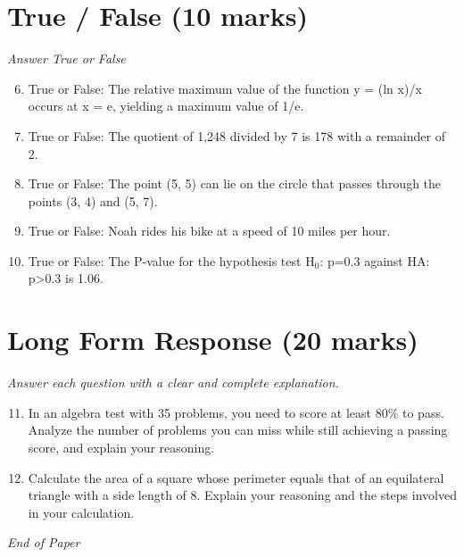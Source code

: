 \documentclass[12pt]{article}
\begin{document}
\section*{True / False (10 marks)}
\textit{Answer True or False}
\begin{enumerate}[label=\arabic*.]
\setcounter{enumi}{5}
\item True or False: The relative maximum value of the function y = (ln x)/x occurs at x = e, yielding a maximum value of 1/e.
\item True or False: The quotient of 1,248 divided by 7 is 178 with a remainder of 2.
\item True or False: The point (5, 5) can lie on the circle that passes through the points (3, 4) and (5, 7).
\item True or False: Noah rides his bike at a speed of 10 miles per hour.
\item True or False: The P-value for the hypothesis test H$_{0}$: p=0.3 against HA: p\textgreater{}0.3 is 1.06.
\end{enumerate}

\section*{Long Form Response (20 marks)}
\textit{Answer each question with a clear and complete explanation.}
\begin{enumerate}[label=\arabic*.]
\setcounter{enumi}{10}
\item In an algebra test with 35 problems, you need to score at least 80\% to pass. Analyze the number of problems you can miss while still achieving a passing score, and explain your reasoning.
\item Calculate the area of a square whose perimeter equals that of an equilateral triangle with a side length of 8. Explain your reasoning and the steps involved in your calculation.
\end{enumerate}

\vfill
\noindent\textit{End of Paper}
\end{document}

